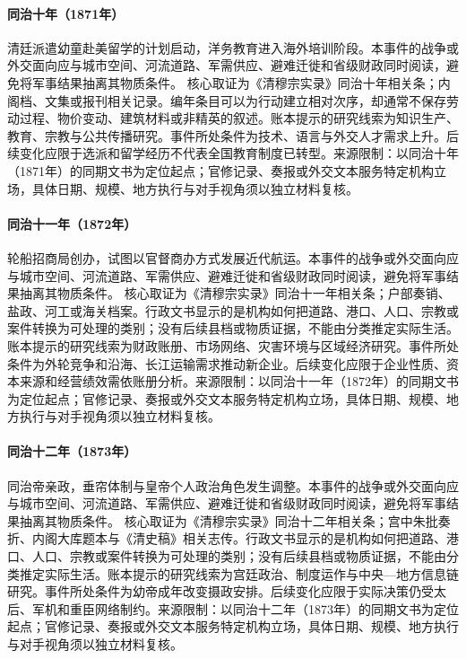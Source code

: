 \hypertarget{civic:EQ-1871-QING-STUDENTS-ABROAD}{}\paragraph{同治十年（1871年）}清廷派遣幼童赴美留学的计划启动，洋务教育进入海外培训阶段。本事件的战争或外交面向应与城市空间、河流道路、军需供应、避难迁徙和省级财政同时阅读，避免将军事结果抽离其物质条件。 核心取证为《清穆宗实录》同治十年相关条；内阁档、文集或报刊相关记录。编年条目可以为行动建立相对次序，却通常不保存劳动过程、物价变动、建筑材料或非精英的叙述。账本提示的研究线索为知识生产、教育、宗教与公共传播研究。事件所处条件为技术、语言与外交人才需求上升。后续变化应限于选派和留学经历不代表全国教育制度已转型。来源限制：以同治十年（1871年）的同期文书为定位起点；官修记录、奏报或外交文本服务特定机构立场，具体日期、规模、地方执行与对手视角须以独立材料复核。
\hypertarget{civic:EQ-1872-CHINA-MERCHANTS-STEAM-NAVIGATION}{}\paragraph{同治十一年（1872年）}轮船招商局创办，试图以官督商办方式发展近代航运。本事件的战争或外交面向应与城市空间、河流道路、军需供应、避难迁徙和省级财政同时阅读，避免将军事结果抽离其物质条件。 核心取证为《清穆宗实录》同治十一年相关条；户部奏销、盐政、河工或海关档案。行政文书显示的是机构如何把道路、港口、人口、宗教或案件转换为可处理的类别；没有后续县档或物质证据，不能由分类推定实际生活。账本提示的研究线索为财政账册、市场网络、灾害环境与区域经济研究。事件所处条件为外轮竞争和沿海、长江运输需求推动新企业。后续变化应限于企业性质、资本来源和经营绩效需依账册分析。来源限制：以同治十一年（1872年）的同期文书为定位起点；官修记录、奏报或外交文本服务特定机构立场，具体日期、规模、地方执行与对手视角须以独立材料复核。
\hypertarget{civic:EQ-1873-TONGZHI-EMPEROR-REIGN}{}\paragraph{同治十二年（1873年）}同治帝亲政，垂帘体制与皇帝个人政治角色发生调整。本事件的战争或外交面向应与城市空间、河流道路、军需供应、避难迁徙和省级财政同时阅读，避免将军事结果抽离其物质条件。 核心取证为《清穆宗实录》同治十二年相关条；宫中朱批奏折、内阁大库题本与《清史稿》相关志传。行政文书显示的是机构如何把道路、港口、人口、宗教或案件转换为可处理的类别；没有后续县档或物质证据，不能由分类推定实际生活。账本提示的研究线索为宫廷政治、制度运作与中央—地方信息链研究。事件所处条件为幼帝成年改变摄政安排。后续变化应限于实际决策仍受太后、军机和重臣网络制约。来源限制：以同治十二年（1873年）的同期文书为定位起点；官修记录、奏报或外交文本服务特定机构立场，具体日期、规模、地方执行与对手视角须以独立材料复核。
